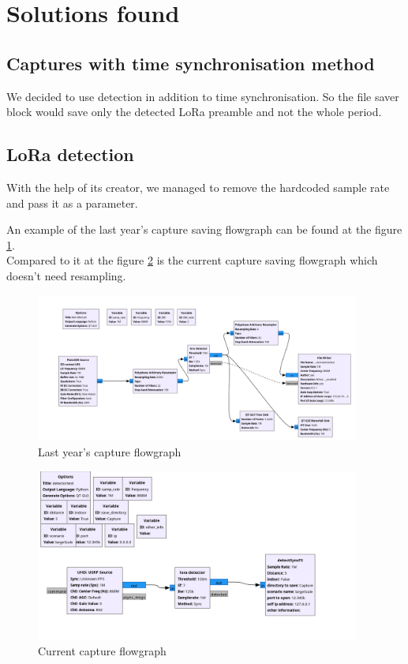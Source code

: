 \documentclass[a4paper, 12pt]{article}
\begin{document}
\section{Solutions found}
\subsection{Captures with time synchronisation method}
We decided to use detection in addition to time synchronisation.
So the file saver block would save only the detected LoRa preamble and not the whole period.

\subsection{LoRa detection}
With the help of its creator, we managed to remove the hardcoded sample rate and pass it as a parameter.

An example of the last year's capture saving flowgraph can be found at the figure \ref{fig:lastGRC}.\\
Compared to it at the figure \ref{fig:nowGRC} is the current capture saving flowgraph which doesn't need resampling.
\begin{figure}[H]
  \begin{center}
    \includegraphics[width=0.95\textwidth]{images/lastGRCDetec.png}
  \end{center}
  \caption{Last year's capture flowgraph}\label{fig:lastGRC}
\end{figure}

\begin{figure}[H]
  \begin{center}
    \includegraphics[width=0.95\textwidth]{images/nowGRCDetec.png}
  \end{center}
  \caption{Current capture flowgraph}\label{fig:nowGRC}
\end{figure}
\end{document}
